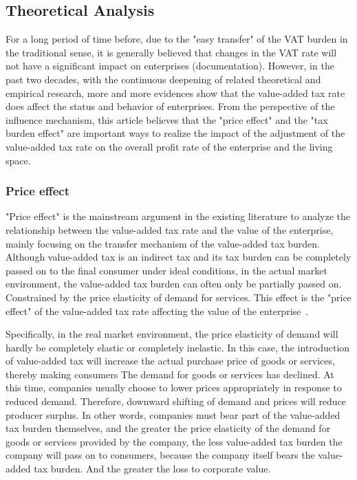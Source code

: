 \documentclass[3p,times]{elsarticle}
\begin{document}
\subsection{Theoretical Analysis}
For a long period of time before, due to the "easy transfer" of the VAT burden in the traditional sense, it is generally believed that changes in the VAT rate will not have a significant impact on enterprises (documentation). However, in the past two decades, with the continuous deepening of related theoretical and empirical research, more and more evidences show that the value-added tax rate does affect the status and behavior of enterprises. From the perspective of the influence mechanism, this article believes that the "price effect" and the "tax burden effect" are important ways to realize the impact of the adjustment of the value-added tax rate on the overall profit rate of the enterprise and the living space.

\subsubsection{Price effect}
"Price effect" is the mainstream argument in the existing literature to analyze the relationship between the value-added tax rate and the value of the enterprise, mainly focusing on the transfer mechanism of the value-added tax burden. Although value-added tax is an indirect tax and its tax burden can be completely passed on to the final consumer under ideal conditions, in the actual market environment, the value-added tax burden can often only be partially passed on. Constrained by the price elasticity of demand for services. This effect is the "price effect" of the value-added tax rate affecting the value of the enterprise~\cite{liu2018theimpact}.

Specifically, in the real market environment, the price elasticity of demand will hardly be completely elastic or completely inelastic. In this case, the introduction of value-added tax will increase the actual purchase price of goods or services, thereby making consumers The demand for goods or services has declined. At this time, companies usually choose to lower prices appropriately in response to reduced demand. Therefore, downward shifting of demand and prices will reduce producer surplus. In other words, companies must bear part of the value-added tax burden themselves, and the greater the price elasticity of the demand for goods or services provided by the company, the less value-added tax burden the company will pass on to consumers, because the company itself bears the value-added tax burden. And the greater the loss to corporate value.
\end{document}

